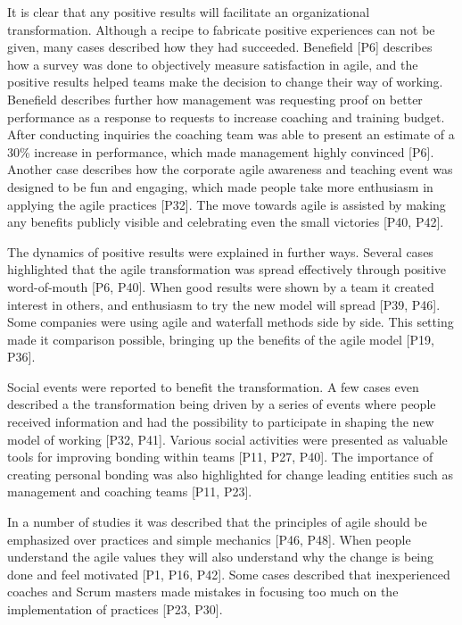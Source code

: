\documentclass[preprint,authoryear,12pt]{elsarticle}
\begin{document}
It is clear that any positive results will facilitate an organizational
transformation. Although a recipe to fabricate positive experiences can not be
given, many cases described how they had succeeded. Benefield [P6] describes how
a survey was done to objectively measure satisfaction in agile, and the positive
results helped teams make the decision to change their way of working. Benefield
describes further how management was requesting proof on better performance as a
response to requests to increase coaching and training budget. After conducting
inquiries the coaching team was able to present an estimate of a 30\% increase
in performance, which made management highly convinced [P6]. Another case
describes how the corporate agile awareness and teaching event was designed to
be fun and engaging, which made people take more enthusiasm in applying the agile
practices [P32]. The move towards agile is assisted by making any benefits
publicly visible and celebrating even the small victories [P40, P42].

The dynamics of positive results were explained in further ways. Several cases
highlighted that the agile transformation was spread effectively through
positive word-of-mouth [P6, P40]. When good results were shown by a team it
created interest in others, and enthusiasm to try the new model will spread
[P39, P46]. Some companies were using agile and waterfall methods side by side.
This setting made it comparison possible, bringing up the benefits of the agile
model [P19, P36].


Social events were reported to benefit the transformation. A few cases even
described a the transformation being driven by a series of events where people
received information and had the possibility to participate in shaping the new
model of working [P32, P41]. Various social activities were presented as
valuable tools for improving bonding within teams [P11, P27, P40]. The importance of
creating personal bonding was also highlighted for change leading entities such
as management and coaching teams [P11, P23].


In a number of studies it was described that the principles of agile should be
emphasized over practices and simple mechanics [P46, P48]. When people
understand the agile values they will also understand why the change is being
done and feel motivated [P1, P16, P42].
Some cases described that inexperienced coaches and Scrum masters made mistakes
in focusing too much on the implementation of practices [P23, P30].
\end{document}
